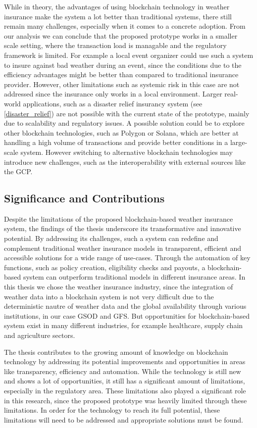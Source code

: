While in theory, the advantages of using blockchain technology in weather insurance make the system a lot better than traditional systems, there still remain many challenges, especially when it comes to a concrete adoption. From our analysis we can conclude that the proposed prototype works in a smaller scale setting, where the transaction load is managable and the regulatory framework is limited. For example a local event organizer could use such a system to insure against bad weather during an event, since the conditions due to the efficiency advantages might be better than compared to traditional insurance provider. However, other limitations such as systemic risk in this case are not addressed since the insurance only works in a local environment. Larger real-world applications, such as a disaster relief insurancy system (see \cref{disaster_relief}) are not possible with the current state of the prototype, mainly due to scalability and regulatory issues. A possible solution could be to explore other blockchain technologies, such as Polygon or Solana, which are better at handling a high volume of transactions and provide better conditions in a large-scale system. However switching to alternative blockchain technologies may introduce new challenges, such as the interoperability with external sources like the GCP.

\subsection{Significance and Contributions}
Despite the limitations of the proposed blockchain-based weather insurance system, the findings of the thesis underscore its transformative and innovative potential. By addressing its challenges, such a system can redefine and complement traditional weather insurance models in transparent, efficient and accessible solutions for a wide range of use-cases. Through the automation of key functions, such as policy creation, eligibility checks and payouts, a blockchain-based system can outperform traditional models in different insurance areas. In this thesis we chose the weather insurance industry, since the integration of weather data into a blockchain system is not very difficult due to the deterministic nautre of weather data and the global availability through various institutions, in our case GSOD and GFS. But opportunities for blockchain-based system exist in many different industries, for example healthcare, supply chain and agriculture sectors. 

The thesis contributes to the growing amount of knowledge on blockchain technology by addressing its potential improvements and opportunities in areas like transparency, efficiency and automation. While the technology is still new and shows a lot of opportunities, it still has a significant amount of limitations, especially in the regulatory area. These limitations also played a significant role in this research, since the proposed prototype was heavily limited through these limitations. In order for the technology to reach its full potential, these limitations will need to be addressed and appropriate solutions must be found.

